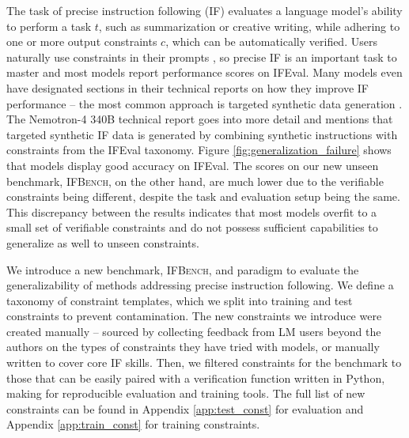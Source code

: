 \documentclass{article}
\newcommand{\benchname}{\textsc{IFBench}\xspace}
\begin{document}
The task of precise instruction following (IF) evaluates a language model's ability to perform a task $t$, such as summarization or creative writing, while adhering to one or more output constraints $c$, which can be automatically verified. 
Users naturally use constraints in their prompts \cite{zhao2024wildchat, lior2025wildifeval}, so precise IF is an important task to master and most models report performance scores on IFEval.
Many models even have designated sections in their technical reports on how they improve IF performance -- the most common approach is targeted synthetic data generation \cite{yang2024qwen2, lambert2024t, adler2024nemotron, grattafiori2024llama}. 
The Nemotron-4 340B technical report \cite{adler2024nemotron} goes into more detail and mentions that targeted synthetic IF data is generated by combining synthetic instructions with constraints from the IFEval taxonomy. 
Figure \ref{fig:generalization_failure} shows that models display good accuracy on IFEval. 
The scores on our new unseen benchmark, \benchname, on the other hand, are much lower due to the verifiable constraints being different, despite the task and evaluation setup being the same. 
This discrepancy between the results indicates that most models overfit to a small set of verifiable constraints and do not possess sufficient capabilities to generalize as well to unseen constraints.


We introduce a new benchmark, \benchname, and paradigm to evaluate the generalizability of methods addressing precise instruction following. We define a taxonomy of constraint templates, which we split into training and test constraints to prevent contamination.
The new constraints we introduce were created manually -- sourced by collecting feedback from LM users beyond the authors on the types of constraints they have tried with models, or manually written to cover core IF skills. 
Then, we filtered constraints for the benchmark to those that can be easily paired with a verification function written in Python, making for reproducible evaluation and training tools.
The full list of new constraints can be found in Appendix \ref{app:test_const} for evaluation and Appendix \ref{app:train_const} for training constraints. 
\end{document}
